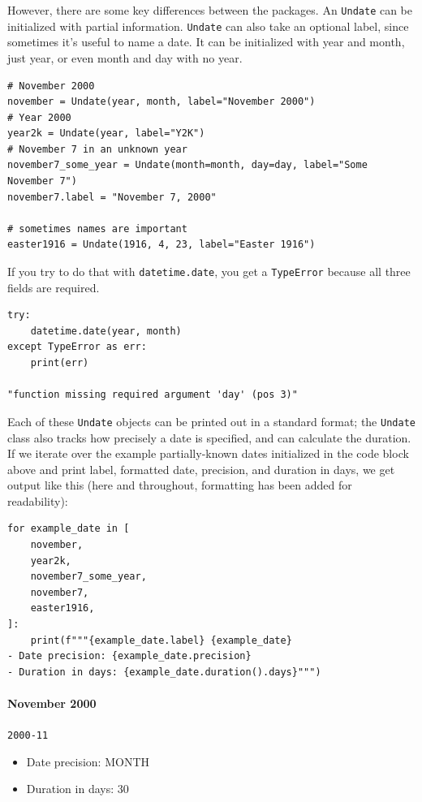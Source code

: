 \documentclass[final]{anthology-ch} %
\begin{document}
However, there are some key differences between the packages. An \texttt{Undate} can be initialized with partial information.  \texttt{Undate} can also take an optional label, since sometimes it's useful to name a date.  It can be initialized with year and month, just year, or even month and day with no year.

\begin{verbatim}
# November 2000
november = Undate(year, month, label="November 2000")
# Year 2000
year2k = Undate(year, label="Y2K")
# November 7 in an unknown year
november7_some_year = Undate(month=month, day=day, label="Some November 7")
november7.label = "November 7, 2000"

# sometimes names are important
easter1916 = Undate(1916, 4, 23, label="Easter 1916")
\end{verbatim}

If you try to do that with \texttt{datetime.date}, you get a \texttt{TypeError} because all three fields are required.

\begin{verbatim}
try:
    datetime.date(year, month)
except TypeError as err:
    print(err)

"function missing required argument 'day' (pos 3)"
\end{verbatim}

Each of these \texttt{Undate} objects can be printed out in a standard format; the \texttt{Undate} class also tracks how precisely a date is specified, and can calculate the duration.  If we iterate over the example partially-known dates initialized in the code block above and print label, formatted date, precision, and duration in days, we get output like this (here and throughout, formatting has been added for readability):

\begin{verbatim}
for example_date in [
    november,
    year2k,
    november7_some_year,
    november7,
    easter1916,
]:
    print(f"""{example_date.label} {example_date}
- Date precision: {example_date.precision}
- Duration in days: {example_date.duration().days}""")
\end{verbatim}

\paragraph{November 2000} \texttt{2000-11}
\begin{itemize}
    \item Date precision: MONTH
    \item Duration in days: 30
\end{itemize}
\end{document}
